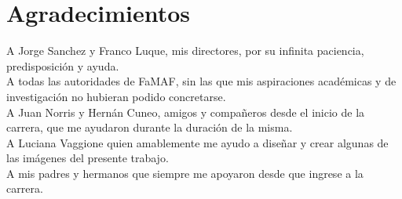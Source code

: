 \newpage
\section*{Agradecimientos}

	\begin{minipage}{0.9\textwidth}
	A Jorge Sanchez y Franco Luque, mis directores, por su infinita paciencia, predisposición y ayuda.\\
	A todas las autoridades de FaMAF, sin las que mis aspiraciones académicas y de investigación no hubieran podido concretarse.	\\
	A Juan Norris y Hernán Cuneo, amigos y compañeros desde el inicio de la carrera, que me ayudaron durante la duración de la misma. \\
	A Luciana Vaggione quien amablemente me ayudo a diseñar y crear algunas de las imágenes del presente trabajo. \\
    A mis padres y hermanos que siempre me apoyaron desde que ingrese a la carrera.
	\end{minipage}
